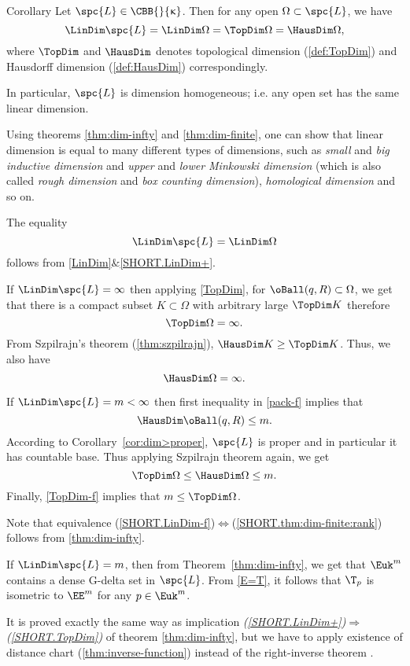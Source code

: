 \begin{thm}{Corollary}\label{dim=dim} 
Let $\spc{L}\in\CBB{}{\kappa}$. 
Then for any open $\Omega\subset \spc{L}$, we have
\[
\LinDim \spc{L}=
\LinDim\Omega =
\TopDim\Omega=
\HausDim\Omega,
\]
where $\TopDim$ and $\HausDim$ denotes  topological dimension (\ref{def:TopDim}) and Hausdorff dimension (\ref{def:HausDim}) correspondingly.

In particular, $\spc{L}$ is dimension homogeneous; i.e. any open set has the same linear dimension.
\end{thm}



Using theorems \ref{thm:dim-infty} and \ref{thm:dim-finite}, 
one can show that linear dimension is equal to many different types of dimensions, such 
as \emph{small} and \emph{big inductive dimension} 
and \emph{upper} and \emph{lower Minkowski dimension} 
(which is also called \emph{rough dimension} and \emph{box counting dimension}), 
\emph{homological dimension} and so on.

The equality
\[\LinDim \spc{L}= \LinDim\Omega\]
follows from \ref{LinDim}$\&$\ref{SHORT.LinDim+}.

If $\LinDim \spc{L}=\infty$ then
applying  \ref{TopDim}, for $\oBall(q,R)\subset \Omega$, we get that there is a compact subset $K\subset \Omega$ with arbitrary large $\TopDim K$ therefore
\[\TopDim\Omega=\infty.\] 
From Szpilrajn's theorem (\ref{thm:szpilrajn}),
$\HausDim K\ge \TopDim K$.
Thus, we also have 
\[\HausDim\Omega=\infty.\]

If $\LinDim \spc{L}=m<\infty$ then first inequality in \ref{pack-f} 
implies that \[\HausDim \oBall(q,R)\le m.\] 
According to Corollary~\ref{cor:dim>proper}, 
$\spc{L}$ is proper and in particular it has countable base. 
Thus applying Szpilrajn theorem  again, we get
\[\TopDim\Omega\le \HausDim \Omega\le m.\]
Finally, \ref{TopDim-f} implies that $m\le\TopDim\Omega$.
\qeds


 Note that equivalence (\ref{SHORT.LinDim-f})$\Leftrightarrow$(\ref{SHORT.thm:dim-finite:rank}) follows from \ref{thm:dim-infty}.

If $\LinDim\spc{L}=m$, then from Theorem~\ref{thm:dim-infty}, 
we get that $\Euk^m$ contains a dense G-delta set in $\spc{L}$.
From \ref{E=T}, it follows that $\T_p$ is isometric to $\EE^m$ for any $p\in \Euk^m$.

 It is proved exactly the same way as implication \textit{(\ref{SHORT.LinDim+})$\Rightarrow$(\ref{SHORT.TopDim})} of theorem \ref{thm:dim-infty}, 
but we have to apply existence of distance chart (\ref{thm:inverse-function}) instead of the right-inverse theorem%
.


